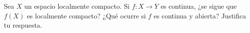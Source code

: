 
\item Sea $X$ un espacio localmente compacto. Si $f: X \rightarrow Y$ es continua, ¿se sigue que $f(X)$ es localmente compacto? ¿Qué ocurre si $f$ es continua y abierta? Justifica tu respuesta.
